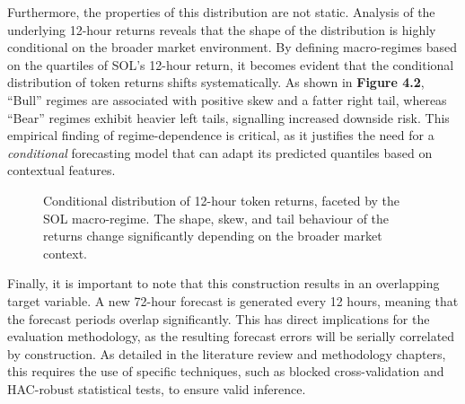 \documentclass[
  a4paper,
  DIV=11,
  numbers=noendperiod]{scrreprt}
\begin{document}
Furthermore, the properties of this distribution are not static.
Analysis of the underlying 12-hour returns reveals that the shape of the
distribution is highly conditional on the broader market environment. By
defining macro-regimes based on the quartiles of SOL's 12-hour return,
it becomes evident that the conditional distribution of token returns
shifts systematically. As shown in \textbf{Figure 4.2}, ``Bull'' regimes
are associated with positive skew and a fatter right tail, whereas
``Bear'' regimes exhibit heavier left tails, signalling increased
downside risk. This empirical finding of regime-dependence is critical,
as it justifies the need for a \emph{conditional} forecasting model that
can adapt its predicted quantiles based on contextual features.

\begin{figure}[H]


\caption{\label{fig-regime-dist}Conditional distribution of 12-hour
token returns, faceted by the SOL macro-regime. The shape, skew, and
tail behaviour of the returns change significantly depending on the
broader market context.}

\end{figure}%

Finally, it is important to note that this construction results in an
overlapping target variable. A new 72-hour forecast is generated every
12 hours, meaning that the forecast periods overlap significantly. This
has direct implications for the evaluation methodology, as the resulting
forecast errors will be serially correlated by construction. As detailed
in the literature review and methodology chapters, this requires the use
of specific techniques, such as blocked cross-validation and HAC-robust
statistical tests, to ensure valid inference.
\end{document}
